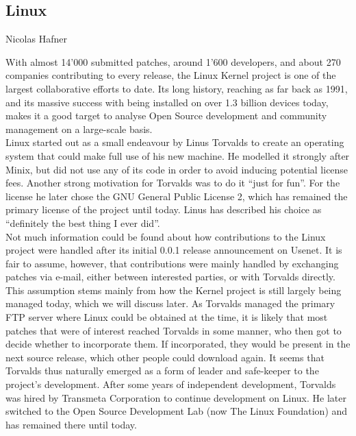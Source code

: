 \subsection{Linux}{Nicolas Hafner}

With almost 14'000 submitted patches, around 1'600 developers, and about 270 companies contributing to every release\cite{linux-whowrites}, the Linux Kernel project is one of the largest collaborative efforts to date. Its long history, reaching as far back as 1991\cite{linux-announce}, and its massive success with being installed on over 1.3 billion devices\cite{linux-usage} today, makes it a good target to analyse Open Source development and community management on a large-scale basis. \\

Linux started out as a small endeavour by Linus Torvalds to create an operating system that could make full use of his new machine. He modelled it strongly after Minix, but did not use any of its code in order to avoid inducing potential license fees. Another strong motivation for Torvalds was to do it ``just for fun''. For the license he later chose the GNU General Public License 2, which has remained the primary license of the project until today. Linus has described his choice as ``definitely the best thing I ever did''. \cite{linus-biography,linux-history} \\

Not much information could be found about how contributions to the Linux project were handled after its initial 0.0.1 release announcement on Usenet. It is fair to assume, however, that contributions were mainly handled by exchanging patches via e-mail, either between interested parties, or with Torvalds directly. This assumption stems mainly from how the Kernel project is still largely being managed today, which we will discuss later. As Torvalds managed the primary FTP server where Linux could be obtained at the time, it is likely that most patches that were of interest reached Torvalds in some manner, who then got to decide whether to incorporate them. If incorporated, they would be present in the next source release, which other people could download again. It seems that Torvalds thus naturally emerged as a form of leader and safe-keeper to the project's development. After some years of independent development, Torvalds was hired by Transmeta Corporation\cite{transmeta} to continue development on Linux. He later switched to the Open Source Development Lab (now The Linux Foundation) and has remained there until today.\cite{linus-biography,linus-osdl} \\

